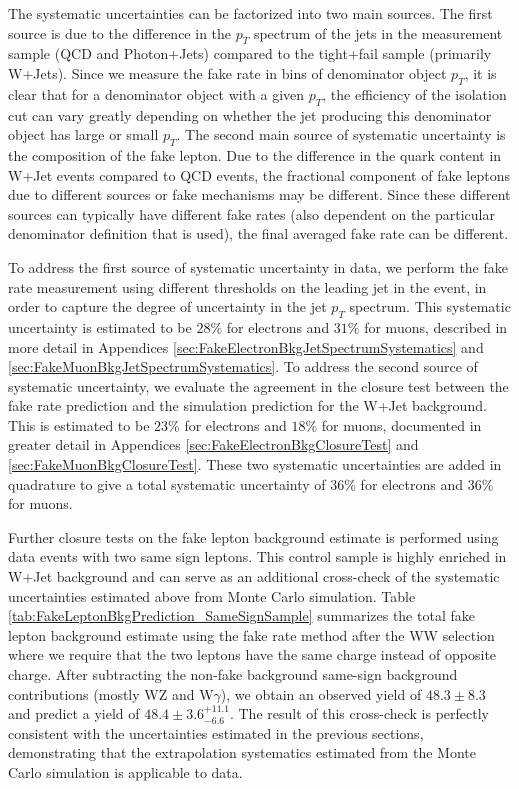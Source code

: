 The systematic uncertainties can be factorized into two main sources. 
The first source is due to the difference in the $p_{T}$ spectrum 
of the jets in the measurement sample (QCD and Photon+Jets) compared
to the tight+fail sample (primarily W+Jets). Since we measure the 
fake rate in bins of denominator object $p_{T}$, it is clear that
for a denominator object with a given $p_{T}$, the efficiency of the
isolation cut can vary greatly depending on whether the jet producing
this denominator object has large or small $p_{T}$. The second main
source of systematic uncertainty is the composition of the fake lepton.
Due to the difference in the quark content in W+Jet events compared
to QCD events, the fractional component of fake leptons due to different 
sources or fake mechanisms may be different. Since these different sources
can typically have different fake rates (also dependent on the particular 
denominator definition that is used), the final averaged fake rate can 
be different.

To address the first source of systematic uncertainty in data, we perform the
fake rate measurement using different thresholds on the leading jet
in the event, in order to capture the degree of uncertainty in 
the jet $p_{T}$ spectrum. This systematic uncertainty is estimated to 
be $28\%$ for electrons and $31\%$ for muons, described in more detail in Appendices 
\ref{sec:FakeElectronBkgJetSpectrumSystematics} and 
\ref{sec:FakeMuonBkgJetSpectrumSystematics}. To address the second 
source of systematic uncertainty, we evaluate the agreement in the closure
test between the fake rate prediction and the simulation prediction for 
the W+Jet background. This is estimated to be $23\%$ for electrons
and $18\%$ for muons, documented in greater 
detail in Appendices \ref{sec:FakeElectronBkgClosureTest} and
\ref{sec:FakeMuonBkgClosureTest}. These two 
systematic uncertainties are added in quadrature to give a total 
systematic uncertainty of $36\%$ for electrons and $36\%$ for muons. 

Further closure tests on the fake lepton background estimate is
performed using data events with two same sign leptons. This control
sample is highly enriched in W+Jet background and can serve as an
additional cross-check of the systematic uncertainties estimated above
from Monte Carlo
simulation. Table \ref{tab:FakeLeptonBkgPrediction_SameSignSample}
summarizes the total fake lepton background estimate using the fake
rate method after the WW selection where we require that the two
leptons have the same charge instead of opposite charge. After
subtracting the non-fake background same-sign background contributions
(mostly WZ and W$\gamma$), we obtain an observed yield of $48.3\pm8.3$
and predict a yield of $48.4\pm3.6^{+11.1}_{-6.6}$. The result of this
cross-check is perfectly consistent with the uncertainties estimated
in the previous sections, demonstrating that the extrapolation
systematics estimated from the Monte Carlo simulation is applicable to
data.

